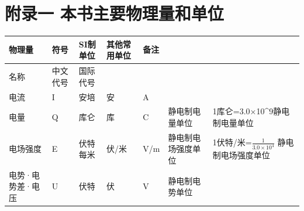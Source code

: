 \chapter{附录一
本书主要物理量和单位}\label{ux9644ux5f55ux4e00-ux672cux4e66ux4e3bux8981ux7269ux7406ux91cfux548cux5355ux4f4d}

{\def\LTcaptype{none} %
\begin{longtable}[]{@{}
  >{\raggedright\arraybackslash}p{}
  >{\raggedright\arraybackslash}p{}
  >{\raggedright\arraybackslash}p{}
  >{\raggedright\arraybackslash}p{}
  >{\raggedright\arraybackslash}p{}
  >{\raggedright\arraybackslash}p{}
  >{\raggedright\arraybackslash}p{}@{}}
\toprule\noalign{}
\begin{minipage}[b]{\linewidth}\raggedright
物理量
\end{minipage} & \begin{minipage}[b]{\linewidth}\raggedright
符号
\end{minipage} & \begin{minipage}[b]{\linewidth}\raggedright
SI制单位
\end{minipage} & \begin{minipage}[b]{\linewidth}\raggedright
其他常用单位
\end{minipage} & \begin{minipage}[b]{\linewidth}\raggedright
备注
\end{minipage} & \begin{minipage}[b]{\linewidth}\raggedright
\end{minipage} & \begin{minipage}[b]{\linewidth}\raggedright
\end{minipage} \\
\midrule\noalign{}
\endhead
\bottomrule\noalign{}
\endlastfoot
名称 & 中文代号 & 国际代号 & & & & \\
电流 & I & 安培 & 安 & A & & \\
电量 & Q & 库仑 & 库 & C & 静电制电量单位 &
1库仑=3.0×10\^{}9静电制电量单位 \\
电场强度 & E & 伏特每米 & 伏/米 & V/m & 静电制电场强度单位 &
1伏特/米=\(\frac{1}{3.0\times10^{4}}\) 静电制电场强度单位 \\
电势·电势差·电压 & U & 伏特 & 伏 & V & 静电制电势单位 &

\end{longtable}}
